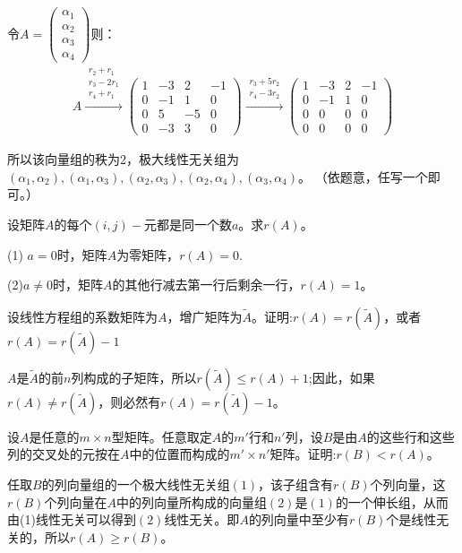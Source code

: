 \documentclass[a4paper]{report}
\begin{document}
\begin{jie}
令$A=
\begin{pmatrix}
\alpha_1\\ \alpha_2\\ \alpha_3\\ \alpha_4
\end{pmatrix}
$则：
\begin{align*}
A\xrightarrow{\substack{r_{2}+r_1 \\ r_3-2r_1\\ r_4+r_1}}{
\begin{pmatrix}
1&-3&2&-1\\ 0&-1&1&0\\ 0&5&-5&0\\ 0&-3&3&0
\end{pmatrix}
}\xrightarrow{\substack{r_{3}+5r_2 \\ r_4-3r_2}}{
\begin{pmatrix}
1&-3&2&-1\\ 0&-1&1&0\\ 0&0&0&0\\ 0&0&0&0
\end{pmatrix}
}
\end{align*}

所以该向量组的秩为2，极大线性无关组为
$(\alpha_1,\alpha_2),(\alpha_1,\alpha_3),(\alpha_2,\alpha_3),(\alpha_2,\alpha_4),(\alpha_3,\alpha_4)$。 （依题意，任写一个即可。）
\end{jie}

\EX 设矩阵$A$的每个$(i,j)-$元都是同一个数$a$。求$r(A)$。

\begin{jie}
(1) $a=0$时，矩阵$A$为零矩阵，$r(A)=0$.

(2)$a\neq 0$时，矩阵$A$的其他行减去第一行后剩余一行，$r(A)=1$。
\end{jie}

\EX 设线性方程组的系数矩阵为$A$，增广矩阵为$\widetilde{A}$。证明:$r(A)=r(\widetilde{A})$，或者$r(A)=r(\widetilde{A})-1$

\begin{zhengming}
$A$是$\widetilde{A}$的前$n$列构成的子矩阵，所以$r(\widetilde{A})\leq r(A)+1$;因此，如果$r(A)\neq r(\widetilde{A})$，则必然有$r(A)=r(\widetilde{A})-1$。
\end{zhengming}

\EX 设$A$是任意的$m\times n$型矩阵。任意取定$A$的$m'$行和$n'$列，设$B$是由$A$的这些行和这些列的交叉处的元按在$A$中的位置而构成的$m'\times n'$矩阵。证明:$r(B)<r(A)$。

\begin{zhengming}
任取$B$的列向量组的一个极大线性无关组$(1)$，该子组含有$r(B)$个列向量，这$r(B)$个列向量在$A$中的列向量所构成的向量组$(2)$是$(1)$的一个伸长组，从而由(1)线性无关可以得到$(2)$线性无关。即$A$的列向量中至少有$r(B)$个是线性无关的，所以$r(A)\geq r(B)$。
\end{zhengming}
\end{document}
